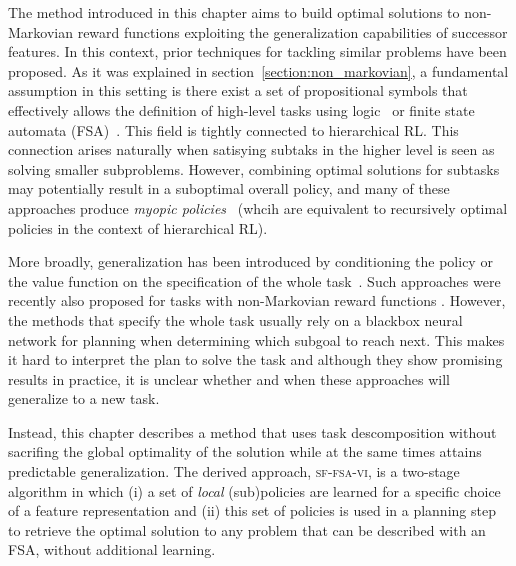
The method introduced in this chapter aims to build optimal solutions to non-Markovian reward functions exploiting the generalization capabilities of successor features. In this context, prior techniques for tackling similar problems have been proposed. As it was explained in section~\ref{section:non_markovian}, a fundamental assumption in this setting is there exist a set of propositional symbols that effectively allows the definition of high-level tasks using logic~\citep{ToroIcarte2019, Vaezipoor2021} or finite state automata (FSA)~\citep{Icarte2022}. This field is tightly connected to hierarchical RL. This connection arises naturally when satisying subtaks in the higher level is seen as solving smaller subproblems. However, combining optimal solutions for subtasks may potentially result in a suboptimal overall policy, and many of these approaches produce \textit{myopic policies}~\citep{Vaezipoor2021} (whcih are equivalent to recursively optimal policies in the context of hierarchical RL).

More broadly, generalization has been introduced by conditioning the policy or the value function on the specification of the whole task~\citep{Schaul2015}. Such approaches were recently also proposed for tasks with non-Markovian reward functions \citep{Vaezipoor2021}. However, the methods that specify the whole task usually rely on a blackbox neural network for planning when determining which subgoal to reach next. This makes it hard to interpret the plan to solve the task and although they show promising results in practice, %
it is unclear whether and when these approaches will generalize to a new task. 

Instead, this chapter describes a method that uses task descomposition without sacrifing the global optimality of the solution while at the same times attains predictable generalization. The derived approach, \textsc{sf-fsa-vi}, is a two-stage algorithm in which (i) a set of \textit{local} (sub)policies are learned for a specific choice of a feature representation and (ii) this set of policies is used in a planning step to retrieve the optimal solution to any problem that can be described with an FSA, without additional learning.

